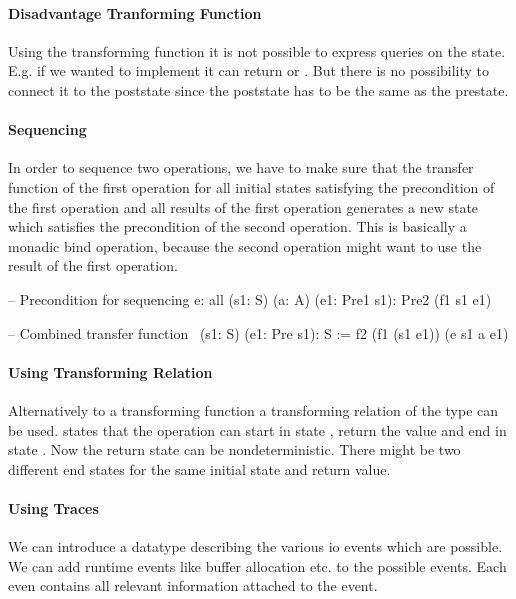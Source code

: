 \paragraph{Disadvantage Tranforming Function} Using the transforming function it
is not possible to express queries on the state. E.g. if we wanted to implement
 it can return  or . But there is no
possibility to connect it to the poststate since the poststate has to be the
same as the prestate.





\paragraph{Sequencing} In order to sequence two operations, we have to make sure
that the transfer function of the first operation for all initial
states satisfying the precondition of the first operation and all results of the
first operation generates a new state which satisfies the precondition of the
second operation. This is basically a monadic bind operation, because the
second operation might want to use the result of the first operation.

\begin{alba}
    -- Precondition for sequencing
    e: all (s1: S) (a: A) (e1: Pre1 s1): Pre2 (f1 s1 e1)

    -- Combined transfer function
    \ (s1: S) (e1: Pre s1): S :=
        f2 (f1 (s1 e1)) (e s1 a e1)
\end{alba}


\paragraph{Using Transforming Relation} Alternatively to a transforming function
a transforming relation of the type 
can be used.  states that the operation can start in state
, return the value  and end in state . Now the return
state can be nondeterministic. There might be two different end states for the
same initial state and return value.


\paragraph{Using Traces} We can introduce a datatype describing the various io
events which are possible. We can add runtime events like buffer allocation etc.
to the possible events. Each even contains all relevant information attached to
the event.


